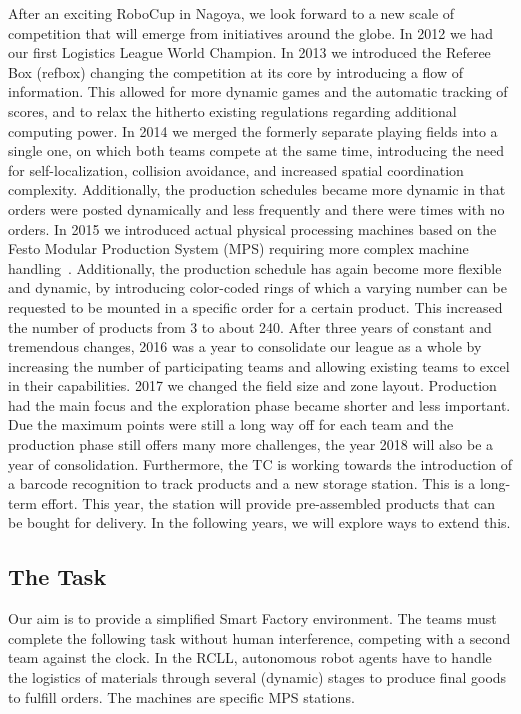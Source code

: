 \documentclass[12pt,twoside]{article}
\begin{document}
After an exciting RoboCup in Nagoya, we look forward to a new scale of
competition that will emerge from initiatives around the globe. In
2012 we had our first Logistics League World Champion.  In 2013 we
introduced the Referee Box (refbox) changing the competition at its
core by introducing a flow of information. This allowed for more
dynamic games and the automatic tracking of scores, and to relax the
hitherto existing regulations regarding additional computing power. In
2014 we merged the formerly separate playing fields into a single one,
on which both teams compete at the same time, introducing the need for
self-localization, collision avoidance, and increased spatial
coordination complexity. Additionally, the production schedules became
more dynamic in that orders were posted dynamically and less
frequently and there were times with no orders. In 2015 we introduced
actual physical processing machines based on the Festo Modular
Production System (MPS) requiring more complex machine
handling~\cite{wdrl2013}. Additionally, the production schedule has
again become more flexible and dynamic, by introducing color-coded
rings of which a varying number can be requested to be mounted in a
specific order for a certain product. This increased the number of
products from 3 to about 240. After three years of constant and
tremendous changes, 2016 was a year to consolidate our league as a
whole by increasing the number of participating teams and allowing
existing teams to excel in their capabilities. 2017 we changed
the field size and zone layout. Production had the main focus and
the exploration phase became shorter and less important.
Due the maximum points were still a long way off for each team and
the production phase still offers many more challenges, the year
2018 will also be a year of consolidation.
Furthermore, the TC is working towards the introduction of a
barcode recognition to track products and a new storage station.
This is a long-term effort. This year, the station
will provide pre-assembled products that can be bought for delivery.
In the following years, we will explore ways to extend this.

\subsection{The Task}
\label{sec:task}

Our aim is to provide a simplified Smart Factory environment. The
teams must complete the following task without human interference,
competing with a second team against the clock. In the RCLL,
autonomous robot agents have to handle the logistics of materials
through several (dynamic) stages to produce final goods to fulfill
orders. The machines are specific MPS stations.
\end{document}
